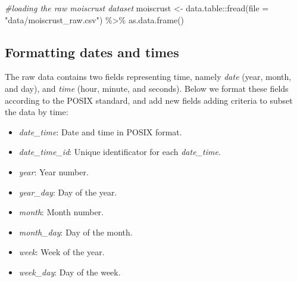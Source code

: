 \documentclass[
  table]{article}
\newenvironment{Shaded}{\begin{snugshade}}{\end{snugshade}}
\newcommand{\AttributeTok}[1]{\textcolor[rgb]{0.77,0.63,0.00}{#1}}
\newcommand{\CommentTok}[1]{\textcolor[rgb]{0.56,0.35,0.01}{\textit{#1}}}
\newcommand{\FunctionTok}[1]{\textcolor[rgb]{0.00,0.00,0.00}{#1}}
\newcommand{\NormalTok}[1]{#1}
\newcommand{\OtherTok}[1]{\textcolor[rgb]{0.56,0.35,0.01}{#1}}
\newcommand{\SpecialCharTok}[1]{\textcolor[rgb]{0.00,0.00,0.00}{#1}}
\newcommand{\StringTok}[1]{\textcolor[rgb]{0.31,0.60,0.02}{#1}}
\providecommand{\tightlist}{%
  \setlength{\itemsep}{0pt}\setlength{\parskip}{0pt}}
\begin{document}
\begin{Shaded}
\begin{Highlighting}[]
\CommentTok{\#loading the raw moiscrust dataset}
\NormalTok{moiscrust }\OtherTok{\textless{}{-}}\NormalTok{ data.table}\SpecialCharTok{::}\FunctionTok{fread}\NormalTok{(}\AttributeTok{file =} \StringTok{"data/moiscrust\_raw.csv"}\NormalTok{) }\SpecialCharTok{\%\textgreater{}\%} 
  \FunctionTok{as.data.frame}\NormalTok{()}
\end{Highlighting}
\end{Shaded}

\hypertarget{formatting-dates-and-times}{%
\subsection{Formatting dates and
times}\label{formatting-dates-and-times}}

The raw data contains two fields representing time, namely \emph{date}
(year, month, and day), and \emph{time} (hour, minute, and seconds).
Below we format these fields according to the POSIX standard, and add
new fields adding criteria to subset the data by time:

\begin{itemize}
\tightlist
\item
  \emph{date\_time}: Date and time in POSIX format.
\item
  \emph{date\_time\_id}: Unique identificator for each
  \emph{date\_time}.
\item
  \emph{year}: Year number.
\item
  \emph{year\_day}: Day of the year.
\item
  \emph{month}: Month number.
\item
  \emph{month\_day}: Day of the month.
\item
  \emph{week}: Week of the year.
\item
  \emph{week\_day}: Day of the week.
\end{itemize}
\end{document}
